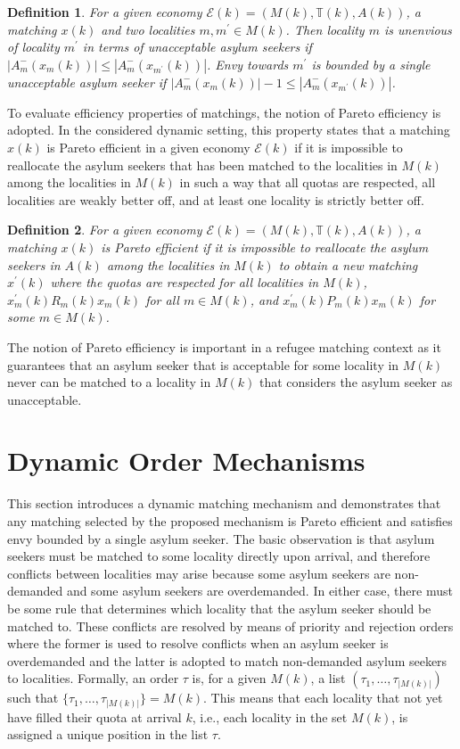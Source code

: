 \documentclass[12pt,fleqn]{article}
\newtheorem{definition}{Definition}
\begin{document}
\begin{definition}\rm\label{DEF:1-Envy_UNACC}
For a given economy $\mathcal{E}(k)=(M(k),\mathbb{T}(k),A(k))$, a matching $x(k)$ and two localities $m,m^\prime\in M(k)$. Then locality $m$ is unenvious of locality $m^\prime$ in terms of unacceptable asylum seekers if $|A_m^-(x_m(k))|\leq |A_m^-(x_{m^\prime}(k))|$. Envy towards $m^\prime$ is bounded by a single unacceptable asylum seeker if $|A_m^-(x_m(k))|-1\leq |A_m^-(x_{m^\prime}(k))|$.
\end{definition}
\noindent To evaluate efficiency properties of matchings, the notion of Pareto efficiency is adopted. In the considered dynamic setting, this property states that a matching $x(k)$ is Pareto efficient in a given economy $\mathcal{E}(k)$ if it is impossible to reallocate the asylum seekers that has been matched to the localities in $M(k)$ among the localities in $M(k)$ in such a way that all quotas are respected, all localities are weakly better off, and at least one locality is strictly better off.
\begin{definition}\rm\label{DEF:Efficiency}
For a given economy $\mathcal{E}(k)=(M(k),\mathbb{T}(k),A(k))$, a matching $x(k)$ is Pareto efficient if it is impossible to reallocate the asylum seekers in $A(k)$ among the localities in $M(k)$ to obtain a new matching $x^\prime(k)$ where the quotas are respected for all localities in $M(k)$, $x_m^\prime(k)R_m(k) x_m(k)$ for all $m\in M(k)$, and $x_m^\prime(k)P_m(k) x_m(k)$ for some $m\in M(k)$.
\end{definition}
\noindent The notion of Pareto efficiency is important in a refugee matching context as it guarantees that an asylum seeker that is acceptable for some locality in $M(k)$ never can be matched to a locality in $M(k)$ that considers the asylum seeker as unacceptable.

\section{Dynamic Order Mechanisms}\label{SEC:Structure_Mechanisms}
This section introduces a dynamic matching mechanism and demonstrates that any matching selected by the proposed mechanism is Pareto efficient and satisfies envy bounded by a single asylum seeker. The basic observation is that asylum seekers must be matched to some locality directly upon arrival, and therefore conflicts between localities may arise because some asylum seekers are non-demanded and some asylum seekers are overdemanded. In either case, there must be some rule that determines which locality that the asylum seeker should be matched to. These conflicts are resolved by means of priority and rejection orders where the former is used to resolve conflicts when an asylum seeker is overdemanded and the latter is adopted to match non-demanded asylum seekers to localities. Formally, an order $\tau$ is, for a given $M(k)$, a list $(\tau_1,\ldots,\tau_{|M(k)|})$ such that $\{\tau_1,\ldots, \tau_{|M(k)|}\}=M(k)$. This means that each locality that not yet have filled their quota at arrival $k$, i.e., each locality in the set $M(k)$, is assigned a unique position in the list $\tau$.
\end{document}
